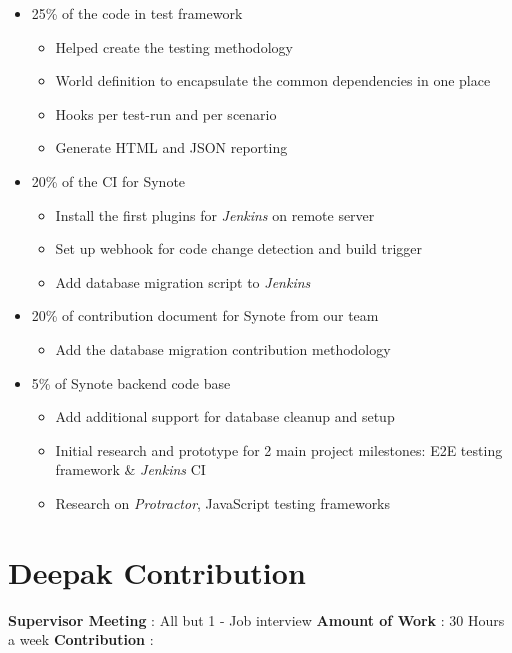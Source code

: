 \begin{itemize}
	\item 25\% of the code in test framework
		\begin{itemize}
			\item Helped create the testing methodology
			\item World definition to encapsulate the common dependencies in one place
			\item Hooks per test-run and per scenario
			\item Generate HTML and JSON reporting
		\end{itemize}
	\item 20\% of the CI for Synote
		\begin{itemize}
			\item Install the first plugins for \textit{Jenkins} on remote server
			\item Set up webhook for code change detection and build trigger
			\item Add database migration script to \textit{Jenkins}
		\end{itemize}
	\item 20\% of contribution document for Synote from our team
		\begin{itemize}
			\item Add the database migration contribution methodology
		\end{itemize}
	\item 5\% of Synote backend code base
		\begin{itemize}
			\item Add additional support for database cleanup and setup
			\item Initial research and prototype for 2 main project milestones: E2E testing framework \& \textit{Jenkins} CI
			\item Research on \textit{Protractor}, JavaScript testing frameworks
		\end{itemize}
\end{itemize}

\section{Deepak Contribution}
\label{sec:deepak-contribution}
\textbf{Supervisor Meeting} : All but 1 - Job interview
\newline
\textbf{Amount of Work} : 30 Hours a week
\newline
\textbf{Contribution} :

